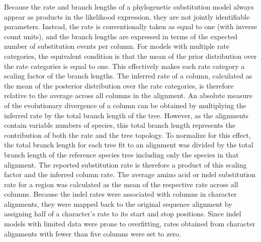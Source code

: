 Because the rate and branch lengths of a phylogenetic substitution model always appear as products in the likelihood expression, they are not jointly identifiable parameters. Instead, the rate is conventionally taken as equal to one (with inverse count units), and the branch lengths are expressed in terms of the expected number of substitution events per column. For models with multiple rate categories, the equivalent condition is that the mean of the prior distribution over the rate categories is equal to one. This effectively makes each rate category a scaling factor of the branch lengths. The inferred rate of a column, calculated as the mean of the posterior distribution over the rate categories, is therefore relative to the average across all columns in the alignment. An absolute measure of the evolutionary divergence of a column can be obtained by multiplying the inferred rate by the total branch length of the tree. However, as the alignments contain variable numbers of species, this total branch length represents the contribution of both the rate and the tree topology. To normalize for this effect, the total branch length for each tree fit to an alignment was divided by the total branch length of the reference species tree including only the species in that alignment. The reported substitution rate is therefore a product of this scaling factor and the inferred column rate. The average amino acid or indel substitution rate for a region was calculated as the mean of the respective rate across all columns. Because the indel rates were associated with columns in character alignments, they were mapped back to the original sequence alignment by assigning half of a character's rate to its start and stop positions. Since indel models with limited data were prone to overfitting, rates obtained from character alignments with fewer than five columns were set to zero.

